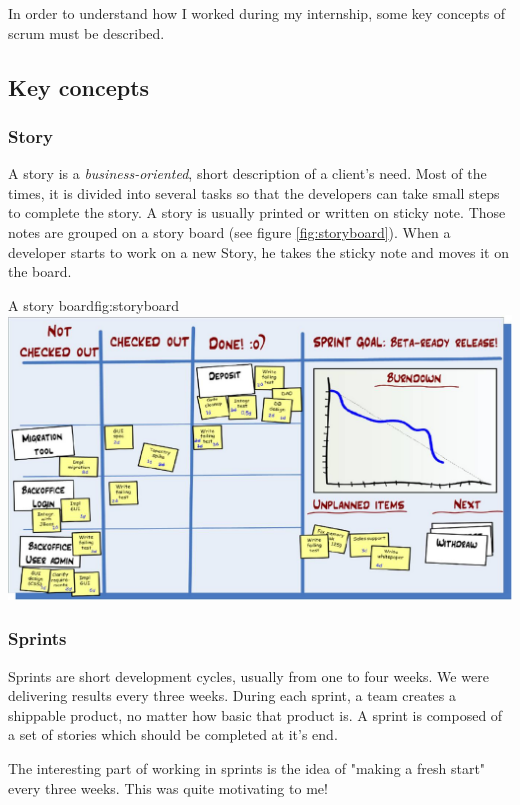In order to understand how I worked during my internship, some key concepts of \gls{scrum} must be described.

\subsection{Key concepts}

\subsubsection{Story}\label{sec:story}
A story is a \emph{business-oriented}, short description of a client's need.
Most of the times, it is divided into several tasks so that the developers
can take small steps to complete the story. A story is usually printed or
written on sticky note. Those notes are grouped on a story board (see figure
\ref{fig:storyboard}). When a developer starts to work on a new Story, he takes
the sticky note and moves it on the board.

\begin{figureGraphics}{A story board}{fig:storyboard}
    \includegraphics[width=\textwidth]{./src/img/taskboard.jpg}
\end{figureGraphics}


\subsubsection{Sprints}\label{sec:sprint}
Sprints are short development cycles, usually from one to four weeks. We were
delivering results every three weeks. During each sprint, a team creates a
shippable product, no matter how basic that product is. A sprint is composed of
a set of stories which should be completed at it's end.

The interesting part of working in sprints is the idea of "making a fresh start" every three weeks. This
was quite motivating to me!


